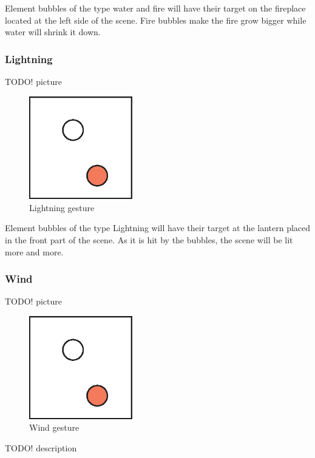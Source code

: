 Element bubbles of the type water and fire will have their target on the fireplace located at the left side of the scene. Fire bubbles make the fire grow bigger while water will shrink it down.

\subsubsection{Lightning}
TODO! picture\\
\begin{figure}[!ht]
\includegraphics[width=0.4\textwidth]{pictures/sample.eps}
\caption{Lightning gesture}
\end{figure}

Element bubbles of the type Lightning will have their target at the lantern placed in the front part of the scene. As it is hit by the bubbles, the scene will be lit more and more.

\subsubsection{Wind}
TODO! picture\\
\begin{figure}[!ht]
\includegraphics[width=0.4\textwidth]{pictures/sample.eps}
\caption{Wind gesture}
\end{figure}
TODO! description\\